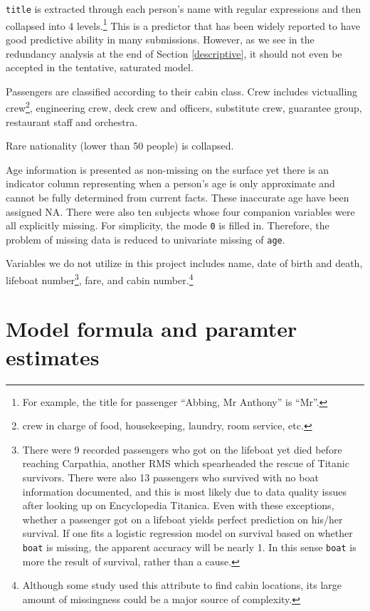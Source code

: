 \documentclass[]{interact}
\theoremstyle{plain}%
\theoremstyle{definition}
\theoremstyle{remark}
\begin{document}
\texttt{title} is extracted through each person's name with regular expressions and then collapsed into 4 levels.\footnote{For example, the title for passenger ``Abbing, Mr Anthony'' is ``Mr''.} This is a predictor that has been widely reported to have good predictive ability in many submissions. However, as we see in the redundancy analysis at the end of Section \ref{descriptive}, it should not even be accepted in the tentative, saturated model.

Passengers are classified according to their cabin class. Crew includes victualling crew\footnote{crew in charge of food, housekeeping, laundry, room service, etc.}, engineering crew, deck crew and officers, substitute crew, guarantee group, restaurant staff and orchestra.

Rare nationality (lower than 50 people) is collapsed.

Age information is presented as non-missing on the surface yet there is an indicator column representing when a person's age is only approximate and cannot be fully determined from current facts. These inaccurate age have been assigned NA. There were also ten subjects whose four companion variables were all explicitly missing. For simplicity, the mode \texttt{0} is filled in. Therefore, the problem of missing data is reduced to univariate missing of \texttt{age}.

Variables we do not utilize in this project includes name, date of birth and death, lifeboat number\footnote{There were 9 recorded passengers who got on the lifeboat yet died before reaching Carpathia, another RMS which spearheaded the rescue of Titanic survivors. There were also 13 passengers who survived with no boat information documented, and this is most likely due to data quality issues after looking up on Encyclopedia Titanica. Even with these exceptions, whether a passenger got on a lifeboat yields perfect prediction on his/her survival. If one fits a logistic regression model on survival based on whether \texttt{boat} is missing, the apparent accuracy will be nearly 1. In this sense \texttt{boat} is more the result of survival, rather than a cause.}, fare, and cabin number.\footnote{Although some study used this attribute to find cabin locations, its large amount of missingness could be a major source of complexity.}

\hypertarget{formula}{%
\section{Model formula and paramter estimates}\label{formula}}
\end{document}
